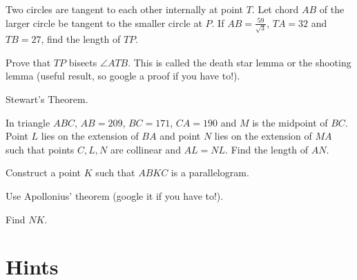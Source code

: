 \documentclass[../jarvis.tex]{subfiles}
\begin{document}
\problem[2019 SMO(O) P17] Two circles are tangent to each other internally at point $T$. Let chord $AB$ of the larger circle be tangent to the smaller circle at $P$. If $AB=\frac{59}{\sqrt{3}}$, $TA=32$ and $TB=27$, find the length of $TP$.
\begin{hints}
    \begin{hint}
        Prove that $TP$ bisects $\angle ATB$. This is called the death star lemma or the shooting lemma (useful result, so google a proof if you have to!).
    \end{hint}
    \begin{hint}
        Stewart's Theorem.
    \end{hint}
\end{hints}
\problem[2019 SMO(O) P15] In triangle $ABC$, $AB=209$, $BC=171$, $CA=190$ and $M$ is the midpoint of $BC$. Point $L$ lies on the extension of $BA$ and point $N$ lies on the extension of $MA$ such that points $C,L,N$ are collinear and $AL=NL$. Find the length of $AN$.
\begin{hints}
    \begin{hint}
        Construct a point $K$ such that $ABKC$ is a parallelogram.
    \end{hint}
    \begin{hint}
        Use Apollonius' theorem (google it if you have to!).
    \end{hint}
    \begin{hint}
        Find $NK$.
    \end{hint}
\end{hints}
\section{Hints}
\printhint
\end{document}
